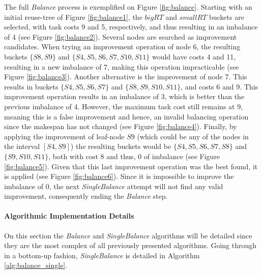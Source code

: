 The full {\em Balance} process is exemplified on Figure \ref{fig:balance}. Starting with an initial reuse-tree of Figure \ref{fig:balance1}, the $bigRT$ and $smallRT$ buckets are selected, with task costs 9 and 5, respectively, and thus resulting in an imbalance of 4 (see Figure \ref{fig:balance2}). Several nodes are searched as improvement candidates. When trying an improvement operation of node 6, the resulting buckets $\{S8,S9\}$ and $\{S4,S5,S6,S7,S10,S11\}$ would have costs 4 and 11, resulting in a new imbalance of 7, making this operation impracticable (see Figure \ref{fig:balance3}). Another alternative is the improvement of node 7. This results in buckets $\{S4,S5,S6,S7\}$ and $\{S8,S9,S10,S11\}$, and costs 6 and 9. This improvement operation results in an imbalance of 3, which is better than the previous imbalance of 4. However, the maximum task cost still remains at 9, meaning this is a false improvement and hence, an invalid balancing operation since the makespan has not changed (see Figure \ref{fig:balance4}). Finally, by applying the improvement of leaf-node $S9$ (which could be any of the nodes in the interval $[S4,S9]$) the resulting buckets would be $\{S4,S5,S6,S7,S8\}$ and $\{S9,S10,S11\}$, both with cost 8 and thus, 0 of imbalance (see Figure \ref{fig:balance5}). Given that this last improvement operation was the best found, it is applied (see Figure \ref{fig:balance6}). Since it is impossible to improve the imbalance of 0, the next {\em SingleBalance} attempt will not find any valid improvement, consequently ending the {\em Balance} step.

\paragraph{Algorithmic Implementation Details}

On this section the {\em Balance} and {\em SingleBalance} algorithms will be detailed since they are the most complex of all previously presented algorithms. Going through in a bottom-up fashion, {\em SingleBalance} is detailed in Algorithm \ref{alg:balance_single}.

